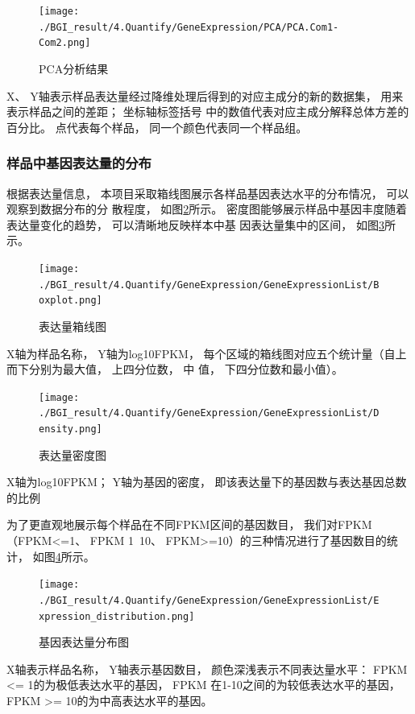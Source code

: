 \documentclass[10pt, oneside,a4paper]{article}
\begin{document}
\begin{figure}[H]
\centering
\texttt{[image: ./BGI\_result/4.Quantify/GeneExpression/PCA/PCA.Com1-Com2.png]}
\par
\renewcommand{\figurename}{图}
\caption{PCA分析结果}
\label{pca_pic}
\end{figure}
\begin{center}
X、 Y轴表示样品表达量经过降维处理后得到的对应主成分的新的数据集， 用来表示样品之间的差距； 坐标轴标签括号
中的数值代表对应主成分解释总体方差的百分比。 点代表每个样品， 同一个颜色代表同一个样品组。
\end{center}

\subsubsection{样品中基因表达量的分布}
根据表达量信息， 本项目采取箱线图展示各样品基因表达水平的分布情况， 可以观察到数据分布的分
散程度， 如图\ref{box}所示。 密度图能够展示样品中基因丰度随着表达量变化的趋势， 可以清晰地反映样本中基
因表达量集中的区间， 如图\ref{density}所示。

\begin{figure}[H]
\centering
\texttt{[image: ./BGI\_result/4.Quantify/GeneExpression/GeneExpressionList/Boxplot.png]}
\par
\renewcommand{\figurename}{图}
\caption{表达量箱线图}
\label{box}
\end{figure}
\begin{center}
X轴为样品名称， Y轴为log10FPKM， 每个区域的箱线图对应五个统计量（自上而下分别为最大值， 上四分位数， 中
值， 下四分位数和最小值）。
\end{center}

\begin{figure}[H]
\centering
\texttt{[image: ./BGI\_result/4.Quantify/GeneExpression/GeneExpressionList/Density.png]}
\par
\renewcommand{\figurename}{图}
\caption{表达量密度图}
\label{density}
\end{figure}
\begin{center}
X轴为log10FPKM； Y轴为基因的密度， 即该表达量下的基因数与表达基因总数的比例
\end{center}


为了更直观地展示每个样品在不同FPKM区间的基因数目， 我们对FPKM（FPKM<=1、 FPKM
1~10、 FPKM>=10）的三种情况进行了基因数目的统计， 如图\ref{genestat_pic}所示。\par
\begin{figure}[H]
\centering
\texttt{[image: ./BGI\_result/4.Quantify/GeneExpression/GeneExpressionList/Expression\_distribution.png]}
\par
\renewcommand{\figurename}{图}
\caption{基因表达量分布图}
\label{genestat_pic}
\end{figure}
\begin{center}
X轴表示样品名称， Y轴表示基因数目， 颜色深浅表示不同表达量水平： FPKM <= 1的为极低表达水平的基因， FPKM
在1-10之间的为较低表达水平的基因， FPKM >= 10的为中高表达水平的基因。
\end{center}
\end{document}
